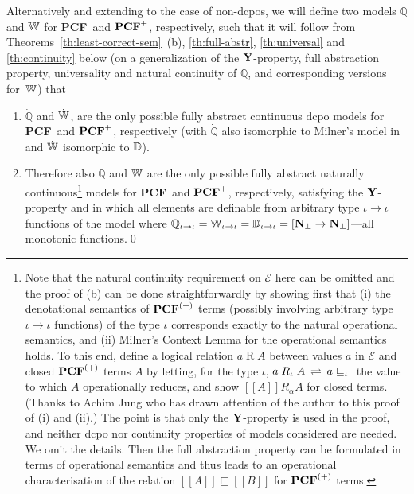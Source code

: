 \documentclass[fleqn]{LMCS}
\theoremstyle{plain}\newtheorem{satz}[thm]{Satz}
\theoremstyle{plain}\newtheorem{hyp}[thm]{Hypothesis}
\theoremstyle{plain}\newtheorem{hyps}[thm]{Hypotheses}
\theoremstyle{definition}\newtheorem{note}[thm]{Note}
\newcommand{\EE}{\mathcal{E}}
\newcommand{\bYdef}{\mathrel{\BYDEF}}
\newcommand{\BYDEF}{\mbox{$\hspace{.2em}\rightleftharpoons\hspace{.2em}$}}
\newcommand{\arr}{\rightarrow}
\newcommand{\Dsem}[1]{[\![ #1 ]\!]}
\newcommand{\NN}{\mathbf{N}}
\newcommand{\bbQ}{\mathbb{Q}}
\newcommand{\PCF}{\mbox{\bf PCF}}
\newcommand{\Y}{\mbox{\bf Y}}
\newcommand{\Undef}{{\perp}}
\newcommand{\dQ}{\dot{\bbQ}}
\newcommand{\dW}{\dot{\bbW}}
\newcommand{\?}{\mbox{?}}
\begin{document}
Alternatively and extending to the case of non-dcpos, we will define 
two models $\bbQ$ and $\mathbb{W}$ 
for \PCF\ and $\PCF^{+}$, respectively, 
such that it will follow from 
Theorems~\ref{th:least-correct-sem}~(b), 
\ref{th:full-abstr}, \ref{th:universal} and \ref{th:continuity} below 
(on a generalization of the $\Y$-property, 
full abstraction property, universality and natural continuity of $\bbQ$, 
and corresponding versions for~$\mathbb{W}$) that 

\begin{thm}\label{th:UNIQUE}\hfill
\begin{enumerate}[\em(a)]
\item $\dQ$ and $\dW$, 
are the only possible  
fully abstract 
continuous dcpo models for \PCF\ and $\PCF^{+}$, respectively 
(with $\dQ$ also isomorphic to Milner's model in \cite{Milner77} 
and $\dW$ isomorphic to $\mathbb{D}$). 

\item Therefore also $\bbQ$ and $\mathbb{W}$ are the only possible 
fully abstract naturally continuous\footnote{Note that the natural continuity requirement on $\EE$ here 
can be omitted and the proof of (b) can be done straightforwardly 
by showing first that (i) the denotational semantics of $\PCF^{(+)}$ terms 
(possibly involving arbitrary type $\iota\arr\iota$ functions)
of the type $\iota$ corresponds exactly to the natural operational semantics, 
and (ii) Milner's Context Lemma \cite{Milner77} for the operational 
semantics holds. 
To this end, define a logical relation $a\mathrel{R}A$
between values $a$ in $\EE$ and closed $\PCF^{(+)}$ terms $A$ 
by letting, for the type $\iota$, 
$a\mathrel{R_\iota}A\bYdef a\sqsubseteq_\iota{}$ the value to which $A$ 
operationally reduces, and show $\Dsem{A}\mathrel{R_\alpha}A$ for closed terms. 
(Thanks to Achim Jung who has drawn attention of the author 
to this proof of (i) and (ii).) 
The point is that only the $\Y$-property is used 
in the proof, and neither dcpo nor continuity properties 
of models considered are needed. We omit the details. 
Then the full abstraction property can be formulated in terms of operational 
semantics and thus leads to an 
operational characterisation of the relation $\Dsem{A}\sqsubseteq\Dsem{B}$ 
for $\PCF^{(+)}$ terms. 
}
models for \PCF\ and $\PCF^{+}$, respectively, satisfying the $\Y$-property and
in which all elements are definable 
from arbitrary type $\iota\arr\iota$ functions of the model 
where 
$\bbQ_{\iota\arr\iota}=\bbW_{\iota\arr\iota}=\bbD_{\iota\arr\iota}=
[\NN_\Undef\arr\NN_\Undef]$---all monotonic functions.\qed
\end{enumerate}

\end{thm}
\end{document}
